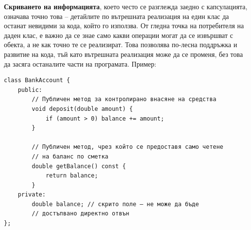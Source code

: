 \documentclass{article}
\begin{document}
\textbf{Скриването на информацията}, което често се разглежда заедно с капсулацията, означава точно това – детайлите по вътрешната реализация на
един клас да останат невидими за кода, който го използва. От гледна точка на потребителя на даден клас, е важно да се знае само какви операции
могат да се извършват с обекта, а не как точно те се реализират. Това позволява по-лесна поддръжка и развитие на кода, тъй като вътрешната реализация
може да се променя, без това да засяга останалите части на програмата. \newline\newline
Пример:
\begin{lstlisting}[style=cpp]
class BankAccount {
    public:
        // Публичен метод за контролирано внасяне на средства
        void deposit(double amount) {
            if (amount > 0) balance += amount;
        }

        // Публичен метод, чрез който се предоставя само четене
        // на баланс по сметка
        double getBalance() const {
            return balance;
        }
    private:
        double balance; // скрито поле – не може да бъде
        // достъпвано директно отвън
};
\end{lstlisting}
\end{document}
